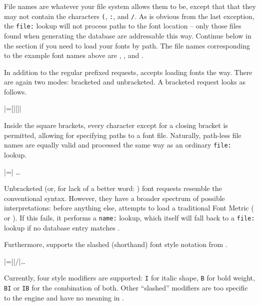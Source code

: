 File names are whatever your file system allows them to be, except
that that they may not contain the characters
  \verb|(|,
  \verb|:|, and
  \verb|/|.
%
As is obvious from the last exception, the \verb|file:| lookup will
not process paths to the font location -- only those
files found when generating the database are addressable this way.
%
Continue below in the \XETEX section if you need to load your fonts
by path.
%
The file names corresponding to the example font names above are
  ,
  , and
  .

\endsubsection


In addition to the regular prefixed requests, 
accepts loading fonts the \XETEX way.
%
There are again two modes: bracketed and unbracketed.
A bracketed request looks as follows.

\beginnarrower
  |\font\fontname=[||]|
\endnarrower

\noindent
Inside the square brackets, every character except for a closing
bracket is permitted, allowing for specifying paths to a font file.
%
Naturally, path-less file names are equally valid and processed the
same way as an ordinary \verb|file:| lookup.

\beginnarrower
  |\font\fontname=| \dots
\endnarrower

Unbracketed (or, for lack of a better word: )
font requests resemble the conventional \TEX syntax.
%
However, they have a broader spectrum of possible interpretations:
before anything else,  attempts to load a
traditional \TEX Font Metric ( or ).
%
If this fails, it performs a \verb|name:| lookup, which itself will
fall back to a \verb|file:| lookup if no database entry matches
.

Furthermore,  supports the slashed (shorthand)
font style notation from \XETEX.

\beginnarrower
  |\font\fontname=||/|\dots
\endnarrower

\noindent
Currently, four style modifiers are supported:
  \verb|I| for italic shape,
  \verb|B| for bold   weight,
  \verb|BI| or \verb|IB| for the combination of both.
%
Other “slashed” modifiers are too specific to the \XETEX engine and
have no meaning in \LUATEX.

